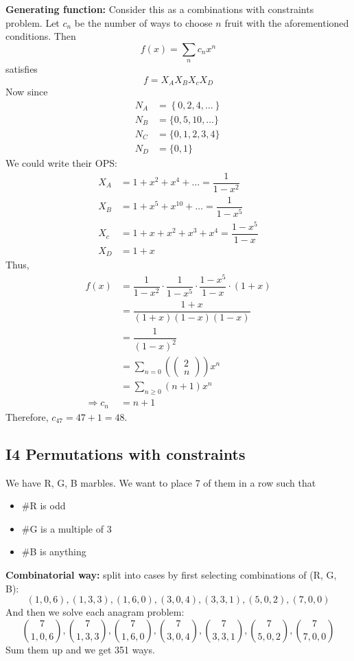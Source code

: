 \documentclass[12pt]{article}
\begin{document}
\textbf{Generating function:} Consider this as a combinations with constraints problem. Let $c_n$ be the number of ways  to choose $n$ fruit with the aforementioned conditions. Then \[f\left( x\right) =\sum _{n}c_{n}x^{n}\] satisfies \[f=X_{A}X_{B}X_{c}X_{D}\]
Now since \begin{align*}
    N_{A}&=\left\{ 0,2,4,\ldots \right\}\\
    N_B &= \{0,5,10,\dots\}\\
    N_C&=\{0,1,2,3,4\}\\
    N_D &= \{0,1\}
\end{align*}
We could write their OPS:
\begin{align*}
    X_{A}&=1+x^{2}+x^{4}+\ldots =\dfrac{1}{1-x^{2}}\\ 
    X_{B}&=1+x^{5}+x^{10}+\ldots =\dfrac{1}{1-x^{5}}\\
    X_{c}&=1+x+x^{2}+x^{3}+x^{4}=\dfrac{1-x^{5}}{1-x}\\ X_{D}&=1+x
\end{align*}
Thus, \begin{align*}
    f\left( x\right) &=\dfrac{1}{1-x^{2}}\cdot \dfrac{1}{1-x^{5}}\cdot \dfrac{1-x^{5}}{1-x}\cdot \left( 1+x\right) \\ &=\dfrac{1+x}{\left( 1+x\right) \left( 1-x\right) \left( 1-x\right) }\\ &=\dfrac{1}{(1-x)^{2}}\\
    &=\sum _{n=0}\left( \begin{pmatrix} 2 \\ n \end{pmatrix}\right) x^{n}\\ &=\sum _{n\geq 0}\left( n+1\right) x^{n}\\ \Rightarrow c_{n}&=n+1
\end{align*}
Therefore, $c_{47}=47+1=48$.

\subsection{I4 Permutations with constraints}
\eg We have R, G, B marbles. We want to place 7 of them in a row such that \begin{itemize}
    \item \#R is odd
    \item \#G is a multiple of 3
    \item \#B is anything
\end{itemize}
\textbf{Combinatorial way:} split into cases by first selecting combinations of (R, G, B): \[(1,0,6), (1,3,3),(1,6,0),(3,0,4),(3,3,1),(5,0,2),(7,0,0)\]
And then we solve each anagram problem:
\[{7\choose 1,0,6}, {7\choose 1,3,3},{7\choose 1,6,0},{7\choose 3,0,4},{7\choose 3,3,1},{7\choose 5,0,2},{7\choose 7,0,0}\]
Sum them up and we get 351 ways.
\end{document}
